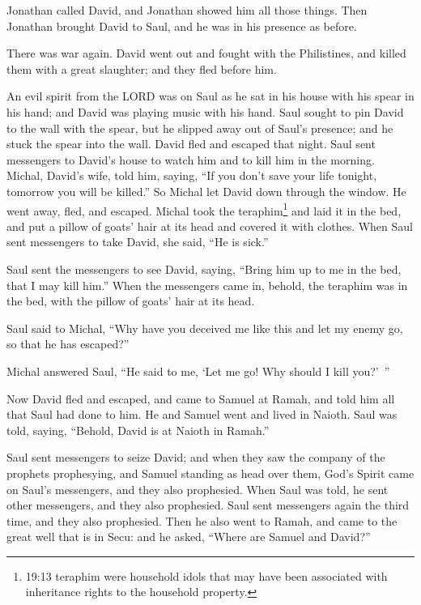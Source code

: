\myverse{}Jonathan called David, and Jonathan showed him all those things.
Then Jonathan brought David to Saul, and he was in his presence as before.

\myverse{}There was war again. David went out and fought with the Philistines,
and killed them with a great slaughter; and they fled before him.

\myverse{}An evil spirit from the LORD was on Saul as he sat in his house
with his spear in his hand; and David was playing music with his hand.
\myverse{}Saul sought to pin David to the wall with the spear, but he slipped away
out of Saul’s presence; and he stuck the spear into the wall. David fled and escaped that night.
\myverse{}Saul sent messengers to David’s house to watch him and to kill him in the
morning. Michal, David’s wife, told him, saying, “If you don’t save your life tonight, tomorrow you will
be killed.”
\myverse{}So Michal let David down through the window. He went away, fled, and escaped.
\myverse{}Michal took the teraphim\footnote{19:13 teraphim were household idols that may have been associated with inheritance rights to the household
	property.} and laid it in the bed, and put a pillow of goats’ hair at its head and covered it
with clothes.
\myverse{}When Saul sent messengers to take David, she said, “He is sick.”

\myverse{}Saul sent the messengers to see David, saying, “Bring him up
to me in the bed, that I may kill him.”
\myverse{}When the messengers came in, behold, the teraphim was in the bed, with the
pillow of goats’ hair at its head.

\myverse{}Saul said to Michal, “Why have you deceived me like this and
let my enemy go, so that he has escaped?”

Michal answered Saul, “He said to me, ‘Let me go! Why should I kill you?’ ”

\myverse{}Now David fled and escaped, and came to Samuel at Ramah, and
told him all that Saul had done to him. He and Samuel went and lived in Naioth.
\myverse{}Saul was told, saying, “Behold, David is at Naioth in Ramah.”

\myverse{}Saul sent messengers to seize David; and when they saw the company
of the prophets prophesying, and Samuel standing as head over them, God’s Spirit came on Saul’s messengers,
and they also prophesied.
\myverse{}When Saul was told, he sent other messengers, and they also prophesied. Saul
sent messengers again the third time, and they also prophesied.
\myverse{}Then he also went to Ramah, and came to the great well that is in Secu: and
he asked, “Where are Samuel and David?”

